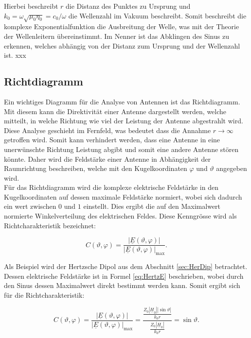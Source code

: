 Hierbei beschreibt $r$ die Distanz des Punktes zu Ursprung und $k_0 = \omega \sqrt{\mu_0 \eta_0} = c_0/\omega$ die Wellenzahl im Vakuum beschreibt. Somit beschreibt die komplexe Exponentialfunktion die Ausbreitung der Welle, was mit der Theorie der Wellenleitern übereinstimmt. Im Nenner ist das Abklingen des Sinus zu erkennen, welches abhängig von der Distanz zum Ursprung und der Wellenzahl ist. xxx

\subsection{Richtdiagramm}

Ein wichtiges Diagramm für die Analyse von Antennen ist das Richtdiagramm. Mit diesem kann die Direktivität einer Antenne dargestellt werden, welche mitteilt, in welche Richtung wie viel der Leistung der Antenne abgestrahlt wird. Diese Analyse geschieht im Fernfeld, was bedeutet dass die Annahme $r \rightarrow \infty$ getroffen wird. Somit kann verhindert werden, dass eine Antenne in eine unerwünschte Richtung Leistung abgibt und somit eine andere Antenne stören könnte. Daher wird die Feldstärke einer Antenne in Abhängigkeit der Raumrichtung beschreiben, welche mit den Kugelkoordinaten $\varphi$ und $\vartheta$ angegeben wird.\\

Für das Richtdiagramm wird die komplexe elektrische Feldstärke in den Kugelkoordinaten auf dessen maximale Feldstärke normiert, wobei sich dadurch ein wert zwischen $0$ und $1$ einstellt. Dies ergibt die auf den Maximalwert normierte Winkelverteilung des elektrischen Feldes. Diese Kenngrösse wird als Richtcharakteristik bezeichnet:

\begin{equation}
C(\vartheta,\varphi) = \frac{|\underline{E}(\vartheta,\varphi)|}{|\underline{E}(\vartheta,\varphi)|_{\mathrm{max}}}.
\end{equation}

Als Beispiel wird der Hertzsche Dipol aus dem Abschnitt \ref{sec:HerDip} betrachtet. Dessen elektrische Feldstärke ist in Formel \ref{eq:HertzE} beschrieben, wobei durch den Sinus dessen Maximalwert direkt bestimmt werden kann. Somit ergibt sich für die Richtcharakteristik:

\begin{equation}\label{eq:HertRicht}
C(\vartheta,\varphi) = \frac{|\underline{E}(\vartheta,\varphi)|}{|\underline{E}(\vartheta,\varphi)|_{\mathrm{max}}} = \frac{\frac{Z_0 |\underline{H}_0| |\sin \vartheta|}{k_0r}}{\frac{Z_0 |\underline{H}_0|}{k_0r}} = \sin \vartheta.
\end{equation}

